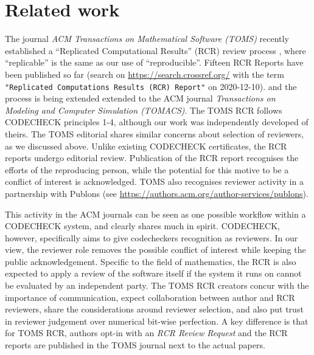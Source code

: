 \documentclass[12pt]{article}
\begin{document}
\section*{Related work}\label{related-work}

The journal \emph{ACM Transactions on Mathematical Software (TOMS)}
recently established a ``Replicated Computational Results'' (RCR)
review process \cite{heroux_editorial_2015}, where ``replicable'' is
the same as our use of ``reproducible''.  Fifteen RCR Reports have
been published so far (search on \url{https://search.crossref.org/}
with the term \texttt{"Replicated Computations Results (RCR) Report"}
on 2020-12-10).
and the process is being extended extended to the ACM journal
\emph{Transactions on Modeling and Computer Simulation (TOMACS)}.
The TOMS RCR follows CODECHECK principles 1-4, although our work was
independently developed of theirs.  The TOMS editorial
\cite{heroux_editorial_2015} shares similar concerns about selection
of reviewers, as we discussed above. Unlike existing CODECHECK
certificates, the RCR reports undergo editorial review.  Publication
of the RCR report recognises the efforts of the reproducing person,
while the potential for this motive to be a conflict of interest is
acknowledged.  TOMS also recognises reviewer activity in a partnership
with Publons (see
\url{https://authors.acm.org/author-services/publons}).

This activity in the ACM journals can be seen as one possible workflow
within a CODECHECK system, and clearly shares much in spirit.
CODECHECK, however, specifically aims to give codecheckers recognition
as reviewers.  In our view, the reviewer role removes the possible
conflict of interest while keeping the public acknowledgement.
Specific to the field of mathematics, the RCR is also expected to
apply a review of the software itself if the system it runs on cannot
be evaluated by an independent party.  The TOMS RCR creators concur
with the importance of communication, expect collaboration between
author and RCR reviewers, share the considerations around reviewer
selection, and also put trust in reviewer judgement over numerical
bit-wise perfection.  A key difference is that for TOMS RCR, authors
opt-in with an \emph{RCR Review Request} and the RCR reports are
published in the TOMS journal next to the actual papers.
\end{document}
